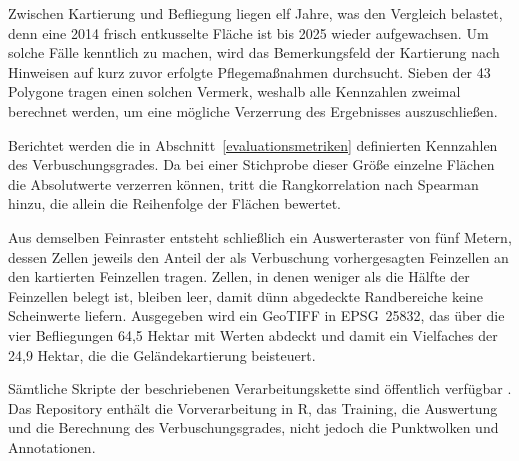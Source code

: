 Zwischen Kartierung und Befliegung liegen elf Jahre, was den Vergleich belastet, denn eine 2014 frisch entkusselte Fläche ist bis 2025 wieder aufgewachsen. Um solche Fälle kenntlich zu machen, wird das Bemerkungsfeld der Kartierung nach Hinweisen auf kurz zuvor erfolgte Pflegemaßnahmen durchsucht. Sieben der 43 Polygone tragen einen solchen Vermerk, weshalb alle Kennzahlen zweimal berechnet werden, um eine mögliche Verzerrung des Ergebnisses auszuschließen.

Berichtet werden die in Abschnitt~\ref{evaluationsmetriken} definierten
Kennzahlen des Verbuschungsgrades. Da bei einer Stichprobe dieser Größe
einzelne Flächen die Absolutwerte verzerren können, tritt die Rangkorrelation
nach Spearman hinzu, die allein die Reihenfolge der Flächen bewertet.

Aus demselben Feinraster entsteht schließlich ein Auswerteraster von fünf Metern, dessen Zellen jeweils den Anteil der als Verbuschung vorhergesagten Feinzellen an den kartierten Feinzellen tragen. Zellen, in denen weniger als die Hälfte der Feinzellen belegt ist, bleiben leer, damit dünn abgedeckte Randbereiche keine Scheinwerte liefern. Ausgegeben wird ein GeoTIFF in EPSG~25832, das über die vier Befliegungen 64,5 Hektar mit Werten abdeckt und damit ein Vielfaches der 24,9 Hektar, die die Geländekartierung beisteuert.

Sämtliche Skripte der beschriebenen Verarbeitungskette sind öffentlich verfügbar \cite{Waldeyer.2026}. Das Repository enthält die Vorverarbeitung in R, das Training, die Auswertung und die Berechnung des Verbuschungsgrades, nicht jedoch die Punktwolken und Annotationen.
